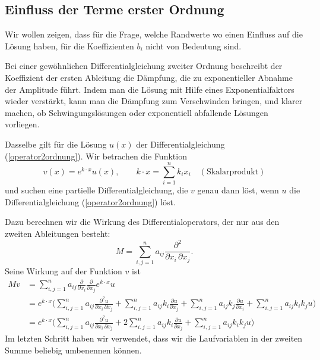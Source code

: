 \subsection{Einfluss der Terme erster Ordnung
\label{einfluss-terme-erster-ordnung}}
Wir wollen zeigen, dass für die Frage, welche Randwerte wo einen
Einfluss auf die Lösung haben, für die Koeffizienten $b_i$ nicht
von Bedeutung sind.

Bei einer gewöhnlichen Differentialgleichung zweiter Ordnung beschreibt
der Koeffizient der ersten Ableitung die Dämpfung, die zu exponentieller
Abnahme der Amplitude führt.
Indem man die Lösung mit Hilfe eines Exponentialfaktors wieder verstärkt,
kann man die Dämpfung zum Verschwinden bringen, und klarer machen,
ob Schwingungslösungen oder exponentiell abfallende Lösungen vorliegen.

Dasselbe gilt für die Lösung $u(x)$ der Differentialgleichung
(\ref{operator2ordnung}).
Wir betrachen die Funktion
\[
v(x)=e^{k\cdot x} u(x),
\qquad
k\cdot x = \sum_{i=1}^n k_ix_i \quad(\text{Skalarprodukt})
\]
und suchen eine partielle Differentialgleichung, die $v$ genau dann löst,
wenn $u$ die Differentialgleichung
(\ref{operator2ordnung}) löst.

Dazu berechnen wir die Wirkung des Differentialoperators, der nur 
aus den zweiten Ableitungen besteht:
\[
M=\sum_{i,j=1}^n a_{ij}\frac{\partial^2}{\partial x_i\,\partial x_j}.
\]
Seine Wirkung auf der Funktion $v$ ist
\begin{align*}
Mv
&=
\sum_{i,j=1}^na_{ij}
\frac{\partial}{\partial x_i}
\frac{\partial}{\partial x_j} e^{k\cdot x}u
\\
&=
e^{k\cdot x}
\biggl(
\sum_{i,j=1}^na_{ij}
\frac{\partial^2 u}{\partial x_i\,\partial x_j}
+
\sum_{i,j=1}^n a_{ij}k_i\frac{\partial u}{\partial x_j}
+
\sum_{i,j=1}^n a_{ij}k_j\frac{\partial u}{\partial x_i}
+
\sum_{i,j=1}^n a_{ij}k_ik_ju
\biggr)
\\
&=
e^{k\cdot x}
\biggl(
\sum_{i,j=1}^na_{ij}
\frac{\partial^2 u}{\partial x_i\,\partial x_j}
+
2\sum_{i,j=1}^n a_{ij}k_i\frac{\partial u}{\partial x_j}
+
\sum_{i,j=1}^n a_{ij}k_ik_ju
\biggr)
\end{align*}
Im letzten Schritt haben wir verwendet, dass wir die Laufvariablen
in der zweiten Summe beliebig umbenennen können.

